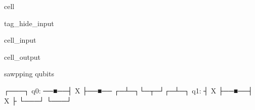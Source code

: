 \documentclass[letterpaper,10pt,english]{jupyterBook}
\begin{document}
\begin{sphinxuseclass}{cell}
\begin{sphinxuseclass}{tag_hide_input}\begin{sphinxVerbatimInput}

\begin{sphinxuseclass}{cell_input}
\begin{sphinxVerbatim}[commandchars=\\\{\}]
   

\end{sphinxVerbatim}

\end{sphinxuseclass}\end{sphinxVerbatimInput}
\begin{sphinxVerbatimOutput}

\begin{sphinxuseclass}{cell_output}
\begin{sphinxVerbatim}[commandchars=\\\{\}]
sawpping qubits
\end{sphinxVerbatim}

\begin{sphinxVerbatim}[commandchars=\\\{\}]
          ┌───┐
q\PYGZus{}0: ──■──┤ X ├──■──
     ┌─┴─┐└─┬─┘┌─┴─┐
q\PYGZus{}1: ┤ X ├──■──┤ X ├
     └───┘     └───┘
\end{sphinxVerbatim}

\end{sphinxuseclass}\end{sphinxVerbatimOutput}

\end{sphinxuseclass}
\end{sphinxuseclass}
\end{document}
